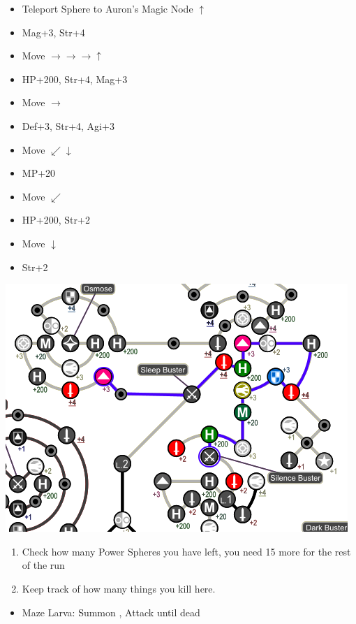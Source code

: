 \begin{spheregrid}
	\begin{itemize}
		\yunaf
		\begin{itemize}
			\item Teleport Sphere to Auron's Magic Node $\uparrow$
			\item Mag+3, Str+4
			\item Move $\rightarrow\rightarrow\rightarrow\uparrow$
			\item HP+200, Str+4, Mag+3
			\item Move $\rightarrow$
			\item Def+3, Str+4, Agi+3
			\item Move $\swarrow\downarrow$
			\item MP+20
			\item Move $\swarrow$
			\item HP+200, Str+2
			\item Move $\downarrow$
			\item Str+2
		\end{itemize}
		\includegraphics[width=.7\columnwidth]{graphics/Yuna_Via_Purifico}
	\end{itemize}
\end{spheregrid}
\begin{enumerate}[resume]
	\item Check how many Power Spheres you have left, you need 15 more for the rest of the run
	\item Keep track of how many things you kill here.
\end{enumerate}
\begin{encounters}
	\begin{itemize}
		\item Maze Larva: Summon \shiva, Attack until dead
	\end{itemize}
\end{encounters}
